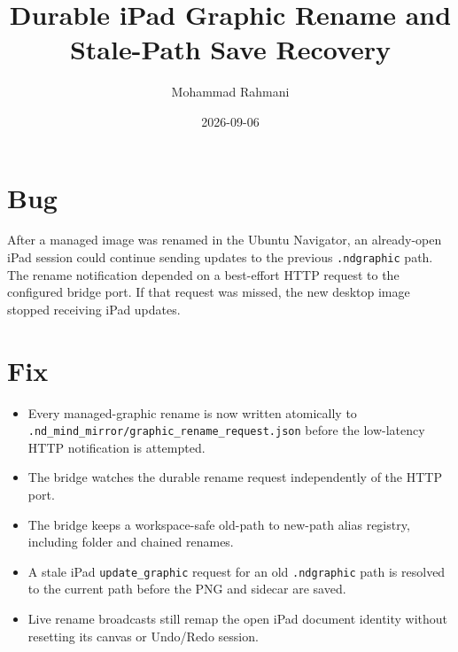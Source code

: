 \documentclass[a4paper]{article}
\title{Durable iPad Graphic Rename and Stale-Path Save Recovery}
\date{2026-09-06}
\author{Mohammad Rahmani}
\begin{document}
   \maketitle

   \section{Bug}
   After a managed image was renamed in the Ubuntu Navigator, an already-open
   iPad session could continue sending updates to the previous
   \texttt{.ndgraphic} path.  The rename notification depended on a
   best-effort HTTP request to the configured bridge port.  If that request was
   missed, the new desktop image stopped receiving iPad updates.

   \section{Fix}
   \begin{itemize}
      \item Every managed-graphic rename is now written atomically to
      \texttt{.nd\_mind\_mirror/graphic\_rename\_request.json} before the
      low-latency HTTP notification is attempted.
      \item The bridge watches the durable rename request independently of the
      HTTP port.
      \item The bridge keeps a workspace-safe old-path to new-path alias
      registry, including folder and chained renames.
      \item A stale iPad \texttt{update\_graphic} request for an old
      \texttt{.ndgraphic} path is resolved to the current path before the PNG
      and sidecar are saved.
      \item Live rename broadcasts still remap the open iPad document identity
      without resetting its canvas or Undo/Redo session.
   \end{itemize}

   
   
\end{document}
